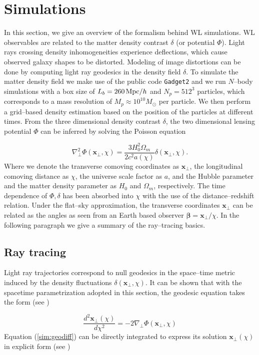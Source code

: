 \documentclass[reprint,aps,prd,superscriptaddress,showkeys,showpacs]{revtex4-1}
\newcommand{\bb}[1]{\mathbf{#1}}
\newcommand{\ttt}[1]{\texttt{#1}}
\begin{document}
\section{Simulations}
\label{sec:sims}
% 
In this section, we give an overview of the formalism behind WL simulations. WL observables are related to the matter density contrast $\delta$ (or potential $\Phi$). Light rays crossing density inhomogeneities experience deflections, which cause observed galaxy shapes to be distorted. Modeling of image distortions can be done by computing light ray geodesics in the density field $\delta$. To simulate the matter density field we make use of the public code \ttt{Gadget2} \citep{Gadget2} and we run $N$--body simulations with a box size of $L_b=260\,{\rm Mpc}/h$ and $N_p=512^3$ particles, which corresponds to a mass resolution of $M_p\approx 10^{10}M_\odot$ per particle. We then perform a grid--based density estimation based on the position of the particles at different times. From the three dimensional density contrast $\delta$, the two dimensional lensing potential $\Phi$ can be inferred by solving the Poisson equation

\begin{equation}
\label{sim:poisson}
\nabla_\perp^2\Phi(\bb{x}_\perp,\chi) = \frac{3H_0^2\Omega_m}{2c^2a(\chi)} \delta(\bb{x}_\perp,\chi).
\end{equation} 
%
Where we denote the transverse comoving coordinates as $\bb{x}_\perp$, the longitudinal comoving distance as $\chi$, the universe scale factor as $a$, and the Hubble parameter and the matter density parameter as  $H_0$ and $\Omega_m$, respectively. The time dependence of $\Phi,\delta$ has been absorbed into $\chi$ with the use of the distance--redshift relation. Under the flat--sky approximation, the transverse coordinates $\bb{x}_\perp$ can be related as the angles as seen from an Earth based observer $\pmb{\beta}=\bb{x}_\perp/\chi$. In the following paragraph we give a summary of the ray--tracing basics.   

\subsection{Ray tracing}
Light ray trajectories correspond to null geodesics in the space--time metric induced by the density fluctuations $\delta(\bb{x}_\perp,\chi)$. It can be shown that with the spacetime parametrization adopted in this section, the geodesic equation takes the form (see \citep{BornFlexion})

\begin{equation}
\label{sim:geodiff}
\frac{d^2 \bb{x}_\perp(\chi)}{d\chi^2} = -2\nabla_\perp \Phi(\bb{x}_\perp,\chi)
\end{equation}
%
Equation (\ref{sim:geodiff}) can be directly integrated to express its solution $\bb{x}_\perp(\chi)$ in explicit form (see \citep{DodelsonWL}) 
\end{document}
